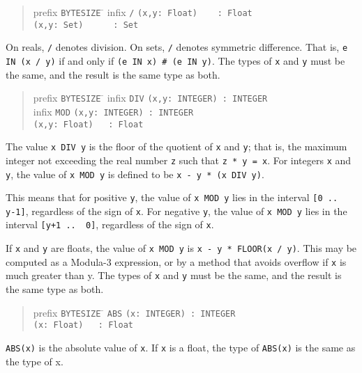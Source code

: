 \documentclass[10pt]{article}
\begin{document}
\begin{quote}
  \begin{tabbing}
    prefix \= \verb|BYTESIZE| \= \kill
    infix  \> \verb|/|       \> \verb|(x,y: Float)    : Float| \\
           \>                \> \verb|(x,y: Set)      : Set|
  \end{tabbing}
\end{quote}
On reals, \verb|/| denotes division.  On sets, \verb|/| denotes symmetric
difference.  That is, \verb|e IN (x / y)| if and only if
\verb|(e IN x) # (e IN y)|.  The types of \verb|x| and \verb|y| must be the
same, and the result is the same type as both.

\begin{quote}
  \begin{tabbing}
    prefix \= \verb|BYTESIZE| \= \kill
    infix  \> \verb|DIV|     \> \verb|(x,y: INTEGER) : INTEGER| \\
    infix  \> \verb|MOD|     \> \verb|(x,y: INTEGER) : INTEGER| \\
           \>                \> \verb|(x,y: Float)   : Float|
  \end{tabbing}
\end{quote}
The value \verb|x DIV y| is the floor of the quotient of \verb|x| and
\verb|y|; that is, the maximum integer not exceeding the real number \verb|z|
such that \verb|z * y = x|.  For integers \verb|x| and \verb|y|, the value of
\verb|x MOD y| is defined to be \verb|x - y * (x DIV y)|.

This means that for positive \verb|y|, the value of \verb|x MOD y| lies in the
interval \verb|[0 ..  y-1]|, regardless of the sign of \verb|x|.  For negative
\verb|y|, the value of \verb|x MOD y| lies in the interval \verb|[y+1 ..  0]|,
regardless of the sign of \verb|x|.

If \verb|x| and \verb|y| are floats, the value of \verb|x MOD y| is
\verb|x - y * FLOOR(x / y)|.  This may be computed as a Modula-3 expression,
or by a method that avoids overflow if \verb|x| is much greater than y.  The
types of \verb|x| and \verb|y| must be the same, and the result is the same
type as both.

\begin{quote}
  \begin{tabbing}
    prefix \= \verb|BYTESIZE| \= \kill
           \> \verb|ABS|     \> \verb|(x: INTEGER) : INTEGER| \\
           \>                \> \verb|(x: Float)   : Float|
  \end{tabbing}
\end{quote}
\verb|ABS(x)| is the absolute value of \verb|x|.  If \verb|x| is a float, the
type of \verb|ABS(x)| is the same as the type of x.
\end{document}
